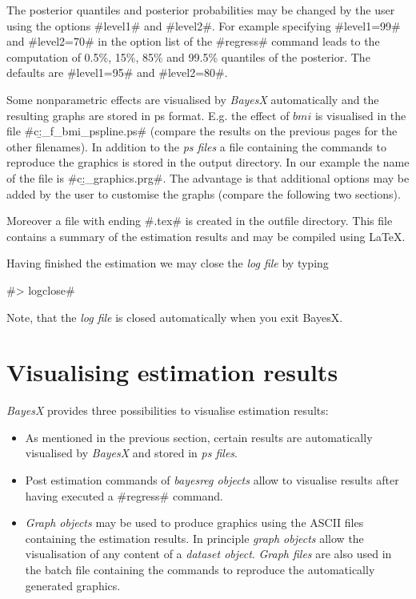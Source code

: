 \documentclass{article}
\begin{document}
The posterior quantiles and posterior probabilities may be changed
by the user using the options #level1# and #level2#. For example
specifying #level1=99# and #level2=70# in the option list of the
#regress# command leads to the computation of 0.5\%, 15\%, 85\%
and 99.5\% quantiles of the posterior. The defaults are
#level1=95# and #level2=80#.

Some nonparametric effects are visualised by {\em BayesX}
automatically and the resulting graphs are stored in ps format.
E.g. the effect of $bmi$ is visualised in the file
#c:\data\b_f_bmi_pspline.ps# (compare the results on the previous
pages for the other filenames). In addition to the {\em ps files}
a file containing the commands to reproduce the graphics is stored
in the output directory. In our example the name of the file is
#c:\data\b_graphics.prg#. The advantage is that additional options
may be added by the user to customise the graphs (compare the
following two sections).

Moreover a file with ending #.tex# is created in the outfile
directory. This file contains a summary of the estimation results
and may be compiled using \LaTeX.

Having finished the estimation we may close the {\it log file} by
typing

#> logclose#

Note, that the {\it log file} is closed automatically when you
exit BayesX.

\section{Visualising estimation results}\label{visual}

{\em BayesX} provides three possibilities to visualise estimation
results:
\begin{itemize}
\item As mentioned in the previous section, certain results are
automatically visualised by {\em BayesX} and stored in {\it ps
files}.
\item Post estimation commands of {\em bayesreg objects} allow to
visualise results after having executed a #regress# command.
\item {\em Graph objects} may be used to produce graphics using the ASCII files containing the estimation results.
In principle {\em graph objects} allow the visualisation of any
content of a {\em dataset object}. {\em Graph files} are also used
in the batch file containing the commands to reproduce the
automatically generated graphics.
\end{itemize}
\end{document}
